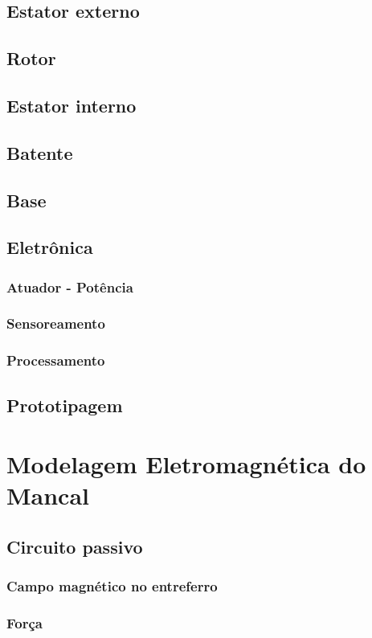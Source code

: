 \documentclass[a4paper,10pt]{report}
\begin{document}
\section{Estator externo}\label{cap:mancal:estator:externo}
\section{Rotor}
\section{Estator interno}
\section{Batente}
\section{Base}
\section{Eletrônica}
	\subsection{Atuador - Potência}
	\subsection{Sensoreamento}
	\subsection{Processamento}
\section{Prototipagem}
\chapter{Modelagem Eletromagnética do Mancal}
\section{Circuito passivo}
\subsection{Campo magnético no entreferro}
\subsection{Força}
\end{document}
